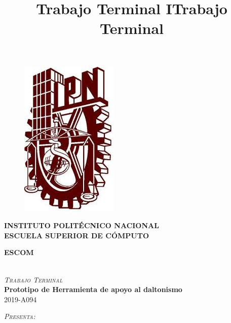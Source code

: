 \documentclass[10pt]{article}
\title{Trabajo Terminal I}
\title{Trabajo Terminal }
\begin{document}
\begin{center}																		%
\newcommand{\HRule}{\rule{\linewidth}{0.5mm}}									%

\begin{figure}[t]
\raggedright
\includegraphics[scale = 0.24]{Imagenes/IPN}
\end{figure}

\vspace*{-1.5 cm}								%
\textsc{\LARGE \bfseries INSTITUTO POLITÉCNICO NACIONAL }\\[0.5cm]	\textsc{\large \bfseries ESCUELA SUPERIOR DE CÓMPUTO}\\[1.5cm]


\begin{minipage}{0.9\textwidth} 
\begin{center}																					%
\textsc{\Large \bfseries ESCOM}
\end{center}
\end{minipage}\\[1.5cm]

\textsc{\large \itshape Trabajo Terminal}\\[0.4cm]

{ \huge \bfseries Prototipo de Herramienta de apoyo al daltonismo}\\[0.4cm]	%

{ \large  2019-A094}\\[1.00cm] 																					%
																	

\begin{center}
\textsc{\Large \itshape Presenta:}\\[0.4cm]
\end{center}


\end{center}
\end{document}
